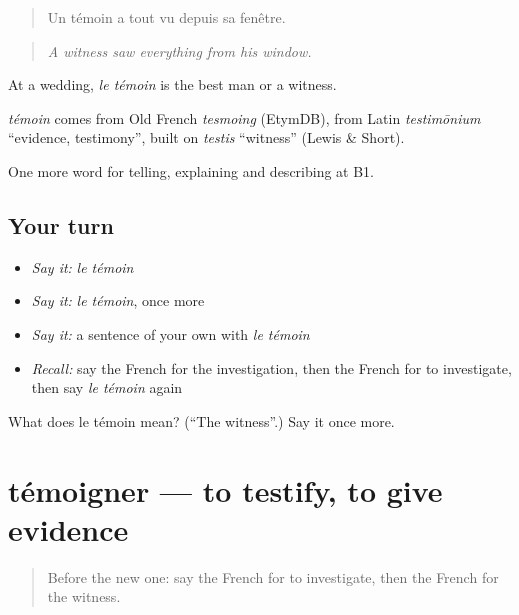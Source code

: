 \begin{quote}
Un témoin a tout vu depuis sa fenêtre.
\end{quote}

\begin{quote}
\emph{A witness saw everything from his window.}
\end{quote}

At a wedding, \emph{le témoin} is the best man or a witness.

\begin{cousinweb}
\emph{témoin} comes from Old French \emph{tesmoing} (EtymDB), from Latin \emph{testimōnium} \textquotedblleft{}evidence, testimony\textquotedblright{}, built on \emph{testis} \textquotedblleft{}witness\textquotedblright{} (Lewis \& Short).
\end{cousinweb}

\begin{grammarlens}[title={What you've built}]
One more word for telling, explaining and describing at B1.
\end{grammarlens}

\subsection*{Your turn}
\begin{itemize}
\raggedright
  \item \emph{Say it:} \emph{le témoin}
  \item \emph{Say it:} \emph{le témoin}, once more
  \item \emph{Say it:} a sentence of your own with \emph{le témoin}
  \item \emph{Recall:} say the French for the investigation, then the French for to investigate, then say \emph{le témoin} again
\end{itemize}

\begin{tcolorbox}[breakable,colback=teal!4,colframe=teal!35!black,title={Before you move on}]
What does le témoin mean? (\textquotedblleft{}The witness\textquotedblright{}.) Say it once more.
\end{tcolorbox}
\section[témoigner]{témoigner — to testify, to give evidence}

\label{lesson:FR-C389-temoigner}



\begin{quote}
Before the new one: say the French for to investigate, then the French for the witness.
\end{quote}

